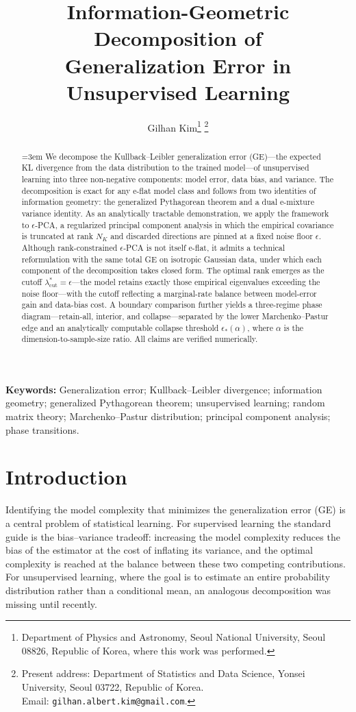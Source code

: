 \documentclass[11pt,a4paper]{article}
\title{Information-Geometric Decomposition of\\
       Generalization Error in Unsupervised Learning}
\author{Gilhan Kim\thanks{Department of Physics and Astronomy,
Seoul National University, Seoul 08826, Republic of Korea, where
this work was performed.}
\thanks{Present address: Department of Statistics and Data Science,
Yonsei University, Seoul 03722, Republic of Korea.\\
Email: \texttt{gilhan.albert.kim@gmail.com}.}}
\date{}
\theoremstyle{definition}
\theoremstyle{remark}
\newcommand{\NK}{N_K}
\begin{document}
\maketitle

\begin{abstract}
\sloppy
\emergencystretch=3em
\noindent
We decompose the Kullback--Leibler generalization error
(GE)---the expected KL divergence from the data distribution to
the trained model---of unsupervised learning into three
non-negative components: model error, data bias, and variance.
The decomposition is exact for any e-flat model class and
follows from two identities of information geometry: the
generalized Pythagorean theorem and a dual e-mixture variance
identity. As an analytically tractable demonstration, we apply
the framework to $\epsilon$-PCA, a regularized principal
component analysis in which the empirical covariance is
truncated at rank $\NK$ and discarded directions are pinned at
a fixed noise floor $\epsilon$. Although rank-constrained
$\epsilon$-PCA is not itself e-flat, it admits a technical
reformulation with the same total GE on isotropic Gaussian
data, under which each component of the decomposition takes
closed form. The optimal rank emerges as the cutoff
$\lambda_{\mathrm{cut}}^{*} = \epsilon$---the model retains
exactly those empirical eigenvalues exceeding the noise
floor---with the cutoff reflecting a marginal-rate balance
between model-error gain and data-bias cost. A boundary
comparison further yields a three-regime phase
diagram---retain-all, interior, and collapse---separated by the
lower Marchenko--Pastur edge and an analytically computable
collapse threshold $\epsilon_{*}(\alpha)$, where $\alpha$ is
the dimension-to-sample-size ratio. All claims are verified
numerically.
\end{abstract}

\medskip
\noindent
\textbf{Keywords:}
Generalization error;
Kullback--Leibler divergence;
information geometry;
generalized Pythagorean theorem;
unsupervised learning;
random matrix theory;
Marchenko--Pastur distribution;
principal component analysis;
phase transitions.
\medskip

\section{Introduction}
\label{sec:intro}

Identifying the model complexity that minimizes the generalization error
(GE) is a central problem of statistical learning.
For supervised learning the standard guide is the bias--variance
tradeoff: increasing the model complexity reduces the bias of the
estimator at the cost of inflating its variance, and the optimal
complexity is reached at the balance between these two competing
contributions.
For unsupervised learning, where the goal is to estimate an entire
probability distribution rather than a conditional mean, an analogous
decomposition was missing until recently.
\end{document}
